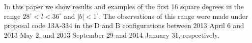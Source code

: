 \documentclass{aa}
\newcommand{\kms}{km~s$^{-1}$}
\DeclareRobustCommand{\kms}{km\,${\rm s}^{-1}$}
\begin{document}
In this paper we show results and examples of the first 16 square degrees in the range  $28^\circ<l<36^\circ$ and $|b|<1^\circ$. The observations of this range were made under proposal code 13A-334 in the D and B configurations between 2013 April 6 and 2013 May 2, and 2013 September 29 and 2014 January 31, respectively. 






\end{document}

